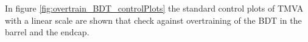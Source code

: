 In figure \ref{fig:overtrain_BDT_controlPlots} the standard control plots of TMVA with a linear scale are shown that check against overtraining of the BDT in the barrel and the endcap. 
%
